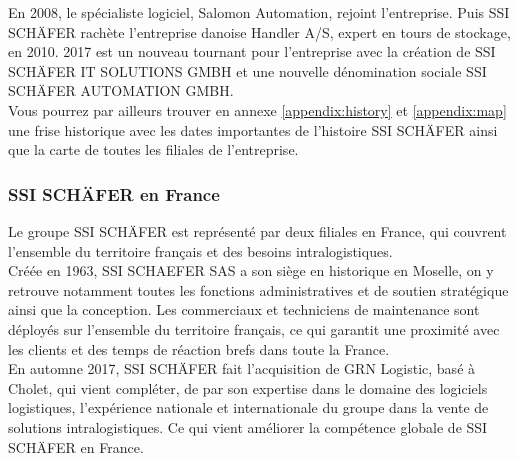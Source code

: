 \documentclass[a4paper, 12pt, french]{article}
\begin{document}
	En 2008, le spécialiste logiciel, Salomon Automation, rejoint l'entreprise. Puis SSI SCHÄFER rachète l'entreprise danoise Handler A/S, expert en tours de stockage, en 2010. 2017 est un nouveau tournant pour l'entreprise avec la création de SSI SCHÄFER IT SOLUTIONS GMBH et une nouvelle dénomination sociale SSI SCHÄFER AUTOMATION GMBH.\\
			
	Vous pourrez par ailleurs trouver en annexe \ref{appendix:history} et \ref{appendix:map} une frise historique avec les dates importantes de l'histoire SSI SCHÄFER ainsi que la carte de toutes les filiales de l'entreprise.

			\subsubsection{SSI SCHÄFER en France}
	Le groupe SSI SCHÄFER est représenté par deux filiales en France, qui couvrent l'ensemble du territoire français et des besoins intralogistiques.\\

	Créée en 1963, SSI SCHAEFER SAS a son siège en historique en Moselle, on y retrouve notamment toutes les fonctions administratives et de soutien stratégique ainsi que la conception. Les commerciaux et techniciens de maintenance sont déployés sur l'ensemble du territoire français, ce qui garantit une proximité avec les clients et des temps de réaction brefs dans toute la France.\\

	En automne 2017, SSI SCHÄFER fait l'acquisition de GRN Logistic, basé à Cholet, qui vient compléter, de par son expertise dans le domaine des logiciels logistiques, l'expérience nationale et internationale du groupe dans la vente de solutions intralogistiques. Ce qui vient améliorer la compétence globale de SSI SCHÄFER en France.
			
\end{document}
